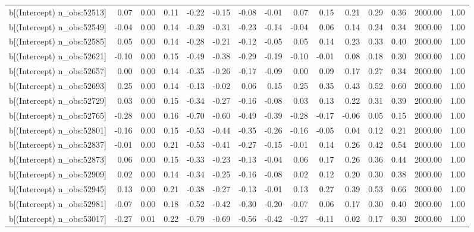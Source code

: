 \begin{table}[ht]
\begin{tabular}{rrrrrrrrrrrrrrr}
  b[(Intercept) n\_obs:52513] & 0.07 & 0.00 & 0.11 & -0.22 & -0.15 & -0.08 & -0.01 & 0.07 & 0.15 & 0.21 & 0.29 & 0.36 & 2000.00 & 1.00 \\ 
  b[(Intercept) n\_obs:52549] & -0.04 & 0.00 & 0.14 & -0.39 & -0.31 & -0.23 & -0.14 & -0.04 & 0.06 & 0.14 & 0.24 & 0.34 & 2000.00 & 1.00 \\ 
  b[(Intercept) n\_obs:52585] & 0.05 & 0.00 & 0.14 & -0.28 & -0.21 & -0.12 & -0.05 & 0.05 & 0.14 & 0.23 & 0.33 & 0.40 & 2000.00 & 1.00 \\ 
  b[(Intercept) n\_obs:52621] & -0.10 & 0.00 & 0.15 & -0.49 & -0.38 & -0.29 & -0.19 & -0.10 & -0.01 & 0.08 & 0.18 & 0.30 & 2000.00 & 1.00 \\ 
  b[(Intercept) n\_obs:52657] & 0.00 & 0.00 & 0.14 & -0.35 & -0.26 & -0.17 & -0.09 & 0.00 & 0.09 & 0.17 & 0.27 & 0.34 & 2000.00 & 1.00 \\ 
  b[(Intercept) n\_obs:52693] & 0.25 & 0.00 & 0.14 & -0.13 & -0.02 & 0.06 & 0.15 & 0.25 & 0.35 & 0.43 & 0.52 & 0.60 & 2000.00 & 1.00 \\ 
  b[(Intercept) n\_obs:52729] & 0.03 & 0.00 & 0.15 & -0.34 & -0.27 & -0.16 & -0.08 & 0.03 & 0.13 & 0.22 & 0.31 & 0.39 & 2000.00 & 1.00 \\ 
  b[(Intercept) n\_obs:52765] & -0.28 & 0.00 & 0.16 & -0.70 & -0.60 & -0.49 & -0.39 & -0.28 & -0.17 & -0.06 & 0.05 & 0.15 & 2000.00 & 1.00 \\ 
  b[(Intercept) n\_obs:52801] & -0.16 & 0.00 & 0.15 & -0.53 & -0.44 & -0.35 & -0.26 & -0.16 & -0.05 & 0.04 & 0.12 & 0.21 & 2000.00 & 1.00 \\ 
  b[(Intercept) n\_obs:52837] & -0.01 & 0.00 & 0.21 & -0.53 & -0.41 & -0.27 & -0.15 & -0.01 & 0.14 & 0.26 & 0.42 & 0.54 & 2000.00 & 1.00 \\ 
  b[(Intercept) n\_obs:52873] & 0.06 & 0.00 & 0.15 & -0.33 & -0.23 & -0.13 & -0.04 & 0.06 & 0.17 & 0.26 & 0.36 & 0.44 & 2000.00 & 1.00 \\ 
  b[(Intercept) n\_obs:52909] & 0.02 & 0.00 & 0.14 & -0.34 & -0.25 & -0.16 & -0.08 & 0.02 & 0.12 & 0.20 & 0.30 & 0.38 & 2000.00 & 1.00 \\ 
  b[(Intercept) n\_obs:52945] & 0.13 & 0.00 & 0.21 & -0.38 & -0.27 & -0.13 & -0.01 & 0.13 & 0.27 & 0.39 & 0.53 & 0.66 & 2000.00 & 1.00 \\ 
  b[(Intercept) n\_obs:52981] & -0.07 & 0.00 & 0.18 & -0.52 & -0.42 & -0.30 & -0.20 & -0.07 & 0.06 & 0.17 & 0.30 & 0.40 & 2000.00 & 1.00 \\ 
  b[(Intercept) n\_obs:53017] & -0.27 & 0.01 & 0.22 & -0.79 & -0.69 & -0.56 & -0.42 & -0.27 & -0.11 & 0.02 & 0.17 & 0.30 & 2000.00 & 1.00 \\ 

\end{tabular}
\end{table}
